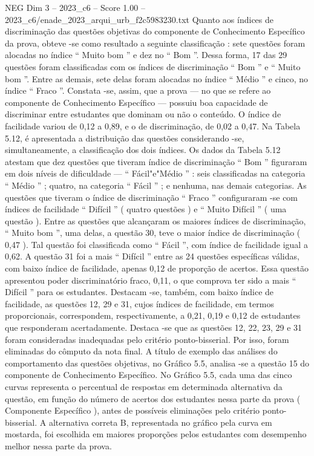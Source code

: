 \begin{textsample}{NEG Dim 3 – 2023\_c6 – Score 1.00 – 2023\_c6/enade\_2023\_arqui\_urb\_f2c5983230.txt}
Quanto aos índices de discriminação das questões objetivas do componente de Conhecimento Específico da prova, obteve -se como resultado a seguinte classificação : sete questões foram alocadas no índice “ Muito bom ” e dez no “ Bom ”.
Dessa forma, 17 das 29 questões foram classificadas com os índices de discriminação “ Bom ” e “ Muito bom ”.
Entre as demais, sete delas foram alocadas no índice “ Médio ” e cinco, no índice “ Fraco ”.
Constata -se, assim, que a prova — no que se refere ao componente de Conhecimento Específico — possuiu boa capacidade de discriminar entre estudantes que dominam ou não o conteúdo.
O índice de facilidade variou de 0,12 a 0,89, e o de discriminação, de 0,02 a 0,47.
Na Tabela 5.12, é apresentada a distribuição das questões considerando -se, simultaneamente, a classificação dos dois índices.
Os dados da Tabela 5.12 atestam que dez questões que tiveram índice de discriminação “ Bom ” figuraram em dois níveis de dificuldade — “ Fácil"e"Médio ” : seis classificadas na categoria “ Médio ” ; quatro, na categoria “ Fácil ” ; e nenhuma, nas demais categorias.
As questões que tiveram o índice de discriminação “ Fraco ” configuraram -se com índices de facilidade “ Difícil ” ( quatro questões ) e “ Muito Difícil ” ( uma questão ).
Entre as questões que alcançaram os maiores índices de discriminação, “ Muito bom ”, uma delas, a questão 30, teve o maior índice de discriminação ( 0,47 ).
Tal questão foi classificada como “ Fácil ”, com índice de facilidade igual a 0,62.
A questão 31 foi a mais “ Difícil ” entre as 24 questões específicas válidas, com baixo índice de facilidade, apenas 0,12 de proporção de acertos.
Essa questão apresentou poder discriminatório fraco, 0,11, o que comprova ter sido a mais “ Difícil ” para os estudantes.
Destacam -se, também, com baixo índice de facilidade, as questões 12, 29 e 31, cujos índices de facilidade, em termos proporcionais, correspondem, respectivamente, a 0,21, 0,19 e 0,12 de estudantes que responderam acertadamente.
Destaca -se que as questões 12, 22, 23, 29 e 31 foram consideradas inadequadas pelo critério ponto-bisserial.
Por isso, foram eliminadas do cômputo da nota final.
A título de exemplo das análises do comportamento das questões objetivas, no Gráfico 5.5, analisa -se a questão 15 do componente de Conhecimento Específico.
No Gráfico 5.5, cada uma das cinco curvas representa o percentual de respostas em determinada alternativa da questão, em função do número de acertos dos estudantes nessa parte da prova ( Componente Específico ), antes de possíveis eliminações pelo critério ponto-bisserial.
A alternativa correta B, representada no gráfico pela curva em mostarda, foi escolhida em maiores proporções pelos estudantes com desempenho melhor nessa parte da prova.

\end{textsample}

